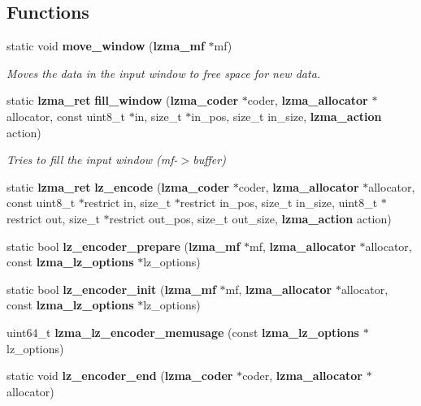 \subsection*{Functions}
\begin{DoxyCompactItemize}
\item 
static void {\bf move\-\_\-window} ({\bf lzma\-\_\-mf} $\ast$mf)
\begin{DoxyCompactList}\small\item\em Moves the data in the input window to free space for new data. \end{DoxyCompactList}\item 
static {\bf lzma\-\_\-ret} {\bf fill\-\_\-window} ({\bf lzma\-\_\-coder} $\ast$coder, {\bf lzma\-\_\-allocator} $\ast$allocator, const uint8\-\_\-t $\ast$in, size\-\_\-t $\ast$in\-\_\-pos, size\-\_\-t in\-\_\-size, {\bf lzma\-\_\-action} action)
\begin{DoxyCompactList}\small\item\em Tries to fill the input window (mf-\/$>$buffer) \end{DoxyCompactList}\item 
static {\bf lzma\-\_\-ret} {\bfseries lz\-\_\-encode} ({\bf lzma\-\_\-coder} $\ast$coder, {\bf lzma\-\_\-allocator} $\ast$allocator, const uint8\-\_\-t $\ast$restrict in, size\-\_\-t $\ast$restrict in\-\_\-pos, size\-\_\-t in\-\_\-size, uint8\-\_\-t $\ast$restrict out, size\-\_\-t $\ast$restrict out\-\_\-pos, size\-\_\-t out\-\_\-size, {\bf lzma\-\_\-action} action)\label{lz__encoder_8c_a1f9b0d169bfa75d11bc1411f1d3ed5f1}

\item 
static bool {\bfseries lz\-\_\-encoder\-\_\-prepare} ({\bf lzma\-\_\-mf} $\ast$mf, {\bf lzma\-\_\-allocator} $\ast$allocator, const {\bf lzma\-\_\-lz\-\_\-options} $\ast$lz\-\_\-options)\label{lz__encoder_8c_afc36bb49c0c64f5cc324443d215e3773}

\item 
static bool {\bfseries lz\-\_\-encoder\-\_\-init} ({\bf lzma\-\_\-mf} $\ast$mf, {\bf lzma\-\_\-allocator} $\ast$allocator, const {\bf lzma\-\_\-lz\-\_\-options} $\ast$lz\-\_\-options)\label{lz__encoder_8c_aa4ec951d4aa73c3cf21f9dd2c153f311}

\item 
uint64\-\_\-t {\bfseries lzma\-\_\-lz\-\_\-encoder\-\_\-memusage} (const {\bf lzma\-\_\-lz\-\_\-options} $\ast$lz\-\_\-options)\label{lz__encoder_8c_aa3748d94a78e951b0a2f3e38c21e8049}

\item 
static void {\bfseries lz\-\_\-encoder\-\_\-end} ({\bf lzma\-\_\-coder} $\ast$coder, {\bf lzma\-\_\-allocator} $\ast$allocator)\label{lz__encoder_8c_a085df21818a985dceb67b56bc66bb4f8}


\end{DoxyCompactItemize}

